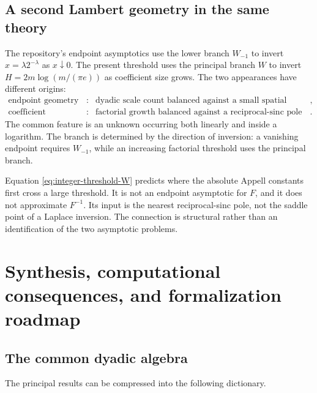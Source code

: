 \documentclass[11pt,oneside]{article}
\theoremstyle{frontier}
\theoremstyle{definition}
\theoremstyle{remark}
\begin{document}
\subsection{A second Lambert geometry in the same theory}

The repository's endpoint asymptotics use the lower branch $W_{-1}$ to invert
$x=\lambda2^{-\lambda}$ as $x\downarrow0$.  The present threshold uses the principal branch $W$
to invert $H=2m\log(m/(\pi e))$ as coefficient size grows.  The two appearances have different
origins:
\begin{equation}
 \begin{array}{ccl}
 \text{endpoint geometry} &:&
 \text{dyadic scale count balanced against a small spatial argument},\\[0.25em]
 \text{coefficient geometry} &:&
 \text{factorial growth balanced against a reciprocal-sinc pole radius}.
 \end{array}
 \label{eq:two-Lambert-roles}
\end{equation}
The common feature is an unknown occurring both linearly and inside a logarithm.  The branch is
determined by the direction of inversion: a vanishing endpoint requires $W_{-1}$, while an increasing
factorial threshold uses the principal branch.

\begin{cautionbox}
Equation \eqref{eq:integer-threshold-W} predicts where the absolute Appell constants first cross a
large threshold.  It is not an endpoint asymptotic for $F$, and it does not approximate $F^{-1}$.
Its input is the nearest reciprocal-sinc pole, not the saddle point of a Laplace inversion.  The
connection is structural rather than an identification of the two asymptotic problems.
\end{cautionbox}

\section{Synthesis, computational consequences, and formalization roadmap}
\label{sec:synthesis}

\subsection{The common dyadic algebra}

The principal results can be compressed into the following dictionary.
\end{document}
